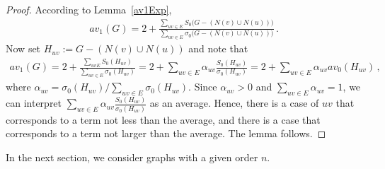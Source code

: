 \documentclass[a4paper,12pt]{amsart}
\theoremstyle{remark}
\begin{document}
\begin{proof}
According to Lemma~\ref{av1Exp},
\begin{align*}
av_1(G)=2+ \frac{\displaystyle\sum_{uv \in E} S_0\big(G-(N(v) \cup N(u))\big)}{\displaystyle\sum_{uv \in E} \sigma_0\big(G-(N(v) \cup N(u))\big)}\,.
\end{align*}
Now set $H_{uv}:=G-(N(v) \cup N(u))$ and note that
\begin{align*}
av_1(G)=2+ \frac{\displaystyle\sum_{uv  E} S_0(H_{uv})}{\displaystyle\sum_{uv \in E} \sigma_0 (H_{uv})}=2+\sum_{uv \in E}\alpha_{uv}\frac{S_0(H_{uv})}{\sigma_0(H_{uv})}=2+ \sum_{uv \in E} \alpha_{uv}av_0(H_{uv})\,,
\end{align*}
where $\alpha_{uv}=\sigma_0(H_{uv}) / \sum_{uv \in E} \sigma_0(H_{uv})$. Since $\alpha_{uv}>0$ and $\sum_{uv \in E} \alpha_{uv}= 1$, we can interpret $\sum_{uv \in E}\alpha_{uv}\frac{S_0(H_{uv})}{\sigma_0(H_{uv})}$ as an average. Hence, there is a case of $uv$ that corresponds to a term not less than the average, and there is a case that corresponds to a term not larger than the average. The lemma follows.
\end{proof}

\medskip

In the next section, we consider graphs with a given order $n$.






\end{document}
